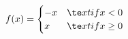 \documentclass[preview]{standalone}
\begin{document}
\begin{align*}
f( x ) = \begin{cases}
        - x  & \te x t{if }  x  < 0 \\
         x  & \te x t{if }  x  \geq 0
        \end{cases}
\end{align*}
\end{document}
